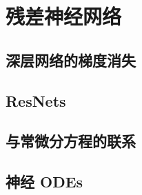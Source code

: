 \chapter{残差神经网络}

\section{深层网络的梯度消失}

\section{ResNets}

\section{与常微分方程的联系}

\section{神经 ODEs}

\newpage

